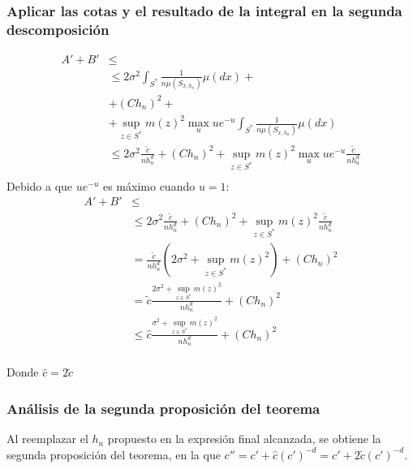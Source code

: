 \documentclass[12pt, a4paper]{article}
\begin{document}
\subsubsection{Aplicar las cotas y el resultado de la integral en la segunda descomposición}
$$
\begin{aligned}
A' + B' &\leq \\
&\leq 2 \sigma^2 \int_{S^{*}} \frac{1}{n\mu(S_{x,h_n})}\mu(dx) +\\&+
(C h_n)^2 
+\\&+
\mathop{sup}_{z \in S^{*}} m(z)^2 \mathop{max}_u ue^{-u} \int_{S^{*}} \frac{1}{n\mu(S_{x,h_n})} \mu(dx) \\
&\leq 2 \sigma^2\frac{\tilde{c}}{nh_n^d} +
(C h_n)^2 
+
\mathop{sup}_{z \in S^{*}} m(z)^2 \mathop{max}_u ue^{-u} \frac{\tilde{c}}{nh_n^d} \\
\end{aligned}
$$
Debido a que $ue^{-u}$ es máximo cuando $u=1$:
$$
\begin{aligned}
A' + B' &\leq \\
&\leq 2 \sigma^2 \frac{\tilde{c}}{nh_n^d} +
(C h_n)^2 
+
\mathop{sup}_{z \in S^{*}} m(z)^2 \frac{\tilde{c}}{nh_n^d} \\
&= \frac{\tilde{c}}{nh_n^d} (2 \sigma^2 +
\mathop{sup}_{z \in S^{*}} m(z)^2)  + (C h_n)^2 \\
&= \tilde{c} \frac{2 \sigma^2 +
\mathop{sup}_{z \in S^{*}} m(z)^2}{nh_n^d}  + (C h_n)^2 \\
&\leq \hat{c} \frac{\sigma^2 +
\mathop{sup}_{z \in S^{*}} m(z)^2}{nh_n^d}  + (C h_n)^2 \\
\end{aligned}
$$

Donde $\hat{c}=2\tilde{c}$ 

\subsubsection{Análisis de la segunda proposición del teorema}
Al reemplazar el $h_n$ propuesto en la expresión final alcanzada, se obtiene la segunda proposición del teorema, en la que $c''=c'+\hat{c}(c')^{-d}=c'+2\tilde{c}(c')^{-d}$.
\end{document}

